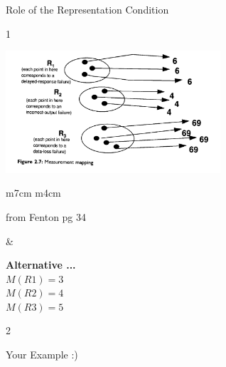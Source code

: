 \documentclass{beamer}
\begin{document}
\begin{frame}{\centerline{Role of the Representation Condition}}
1


\includegraphics[width=80mm]{A2022.IDSEPC.SperimentazioneDeduzione/img-img12.png}

\begin{table}[H]
\begin{tabulary}{\textwidth}{m{7cm} m{4cm}}
\begin{small}
\begin{center}
from Fenton pg 34
\end{center}
\end{small}&
\begin{tcolorbox}
\textbf{Alternative ...}\\
\(M(R1) = 3\)\\
\(M(R2) = 4\)\\
\(M(R3) = 5\)
\end{tcolorbox}

\end{tabulary}
\end{table}


\end{frame}

\begin{frame}{\centerline{}}
2

\begin{center}
{\Large
Your Example :)
}
\end{center}


\end{frame}
\end{document}
